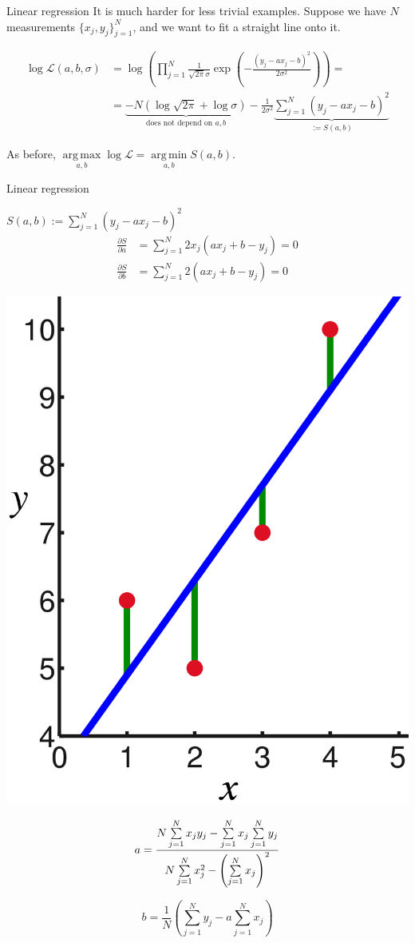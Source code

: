 \documentclass[UKenglish,aspectratio=169]{beamer}
\DeclareMathOperator*{\argmin}{arg\,min}
\DeclareMathOperator*{\argmax}{arg\,max}
\begin{document}
\begin{frame}{Linear regression}
It is much harder for less trivial examples. Suppose we have $N$ measurements $\{x_j, y_j\}_{j=1}^{N}$,
and we want to fit a straight line onto it.

\pause
\begin{align*}
\log \mathcal{L}(a, b,\sigma) & = \log \left(\prod\limits_{j=1}^N  \frac{1}{\sqrt{2\pi}\sigma} \exp\left(-\frac{(y_j - a x_j - b)^2}{2\sigma^2}\right)\right) =\\
& = \underbrace{-N \left(\log\sqrt{2\pi} + \log\sigma\right)}_{\text{does not depend on } a, b} - \frac{1}{2\sigma^2} \underbrace{\sum\limits_{j=1}^N (y_j- a x_j - b)^2}_{:=S(a,b)}
\end{align*}

\pause
As before,
$\argmax\limits_{a,b}\log\mathcal L = \argmin\limits_{a,b} S(a, b)$.
\end{frame}

\begin{frame}{Linear regression}
\begin{minipage}{.45\linewidth}
$S(a,b) := \sum\limits_{j=1}^N (y_j- a x_j - b)^2$
\pause
\begin{align*}
\frac{\partial S}{\partial a} &= \sum\limits_{j=1}^N 2 x_j (a x_j + b - y_j) = 0 \\
\frac{\partial S}{\partial b} &= \sum\limits_{j=1}^N 2 (a x_j + b - y_j) = 0
\end{align*}
\end{minipage}
\begin{minipage}{.45\linewidth}
\centering
\includegraphics[width=.5\columnwidth]{../manuscript/img/c5aa80f6a2e9575abfa7b3dfdabf5c5a.png}
\end{minipage}

\pause
\begin{minipage}{.45\linewidth}
$$
a = \frac{N \sum\limits_{j=1}^N x_j y_j - \sum\limits_{j=1}^N x_j \sum\limits_{j=1}^N y_j}{N\sum\limits_{j=1}^N x_j^2 - \left(\sum\limits_{j=1}^N x_j\right)^2} \\
$$
\end{minipage}
\begin{minipage}{.45\linewidth}
$$
b = \frac{1}{N}\left(  \sum\limits_{j=1}^N y_j - a  \sum\limits_{j=1}^N x_j \right)
$$
\end{minipage}
\end{frame}
\end{document}
